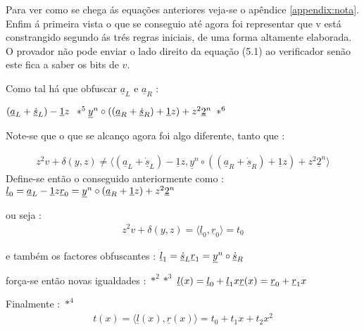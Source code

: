 Para ver como se chega ás equações anteriores veja-se o apêndice \ref{appendix:nota}. Enfim á primeira vista o que se conseguio até agora foi representar que v está constrangido segundo ás trés regras iniciais, de uma forma altamente elaborada.\newline
O provador não pode enviar o lado direito da equação (5.1) ao verificador senão este fica a saber os bits de $v$.

Como tal há que obfuscar $\underline{a}_L$ e $\underline{a}_R$ :\newline

$(\underline{a}_L + \underline{\dot{s}}_L ) - \underline{1}z\enspace *^5\\
\underline{y}^n \circ ((\underline{a}_R + \underline{\dot{s}}_R) + \underline{1}z) + z^2 \underline{2}^n\enspace *^6$


Note-se que o que se alcanço agora foi algo diferente, tanto que : 

\begin{align*}
z^2 v + \delta(y,z) \neq \langle(\underline{a}_L + \underline{\dot{s}}_L) - \underline{1}z, \underline{y}^n \circ ((\underline{a}_R + \underline{\dot{s}}_R) + \underline{1}z) + z^2 \underline{2}^n\rangle 
\end{align*}
\newline
Define-se então o conseguido anteriormente como : \newline
$\underline{l}_0 = \underline{a}_L - \underline{1}z\\
\underline{r}_0 = \underline{y}^n \circ (\underline{a}_R + \underline{1}z) + z^2 \underline{2}^n$

ou seja :
\begin{align*}
z^2 v + \delta(y,z) = \langle \underline{l}_0, \underline{r}_0 \rangle = t_0
\end{align*}

e também os factores obfuscantes : \newline
$\underline{l}_1 = \underline{\dot{s}}_L\\
\underline{r}_1 = \underline{y}^n \circ \underline{\dot{s}}_R$

força-se então novas igualdades : $*^2$$*^3$ \newline
$\underline{l}(x) = \underline{l}_0 + \underline{l}_1 x\\
\underline{r}(x) = \underline{r}_0 + \underline{r}_1 x$

Finalmente : $*^4$
\begin{align*}
t(x) = \langle \underline{l}(x), \underline{r}(x)\rangle = t_0 + t_1 x + t_2 x^2
\end{align*}

